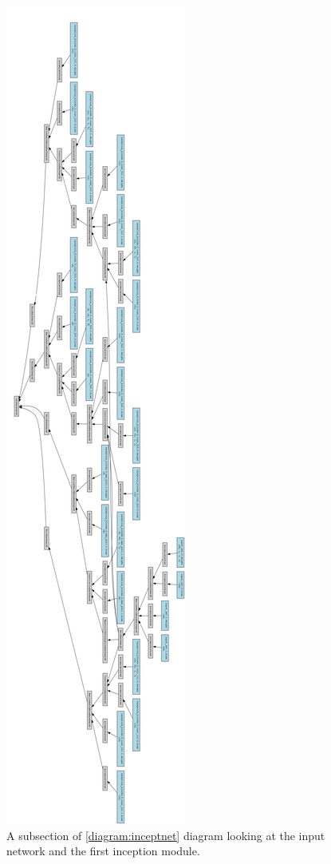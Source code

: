 \begin{figure}[htb]
    \centering
    \includegraphics[width=\paperwidth, height=\textheight, keepaspectratio]{images/graph-input.png}
    \caption{A subsection of \ref{diagram:inceptnet} diagram looking at the input network and the first inception module.}
    \label{diagram:inceptnet-in}
\end{figure}

